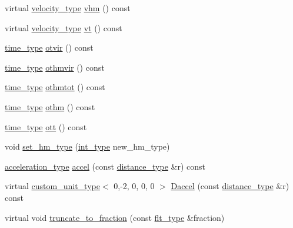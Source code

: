 \begin{DoxyCompactItemize}
\item 
virtual \hyperlink{namespaceIceBRG_a34f8ef3b46f3408301e3c28197095eff}{velocity\+\_\+type} \hyperlink{classIceBRG_1_1density__profile_a9ecd0afe7e8fa7050efe2d984240c0ec}{vhm} () const 
\item 
virtual \hyperlink{namespaceIceBRG_a34f8ef3b46f3408301e3c28197095eff}{velocity\+\_\+type} \hyperlink{classIceBRG_1_1density__profile_a11564ec6ea6103493654000c81ce4bfb}{vt} () const 
\item 
\hyperlink{namespaceIceBRG_abf6c442a2e180ef52c5cefe18e47c327}{time\+\_\+type} \hyperlink{classIceBRG_1_1density__profile_a0215cd84252abdb85682fbcc7eee19f4}{otvir} () const 
\item 
\hyperlink{namespaceIceBRG_abf6c442a2e180ef52c5cefe18e47c327}{time\+\_\+type} \hyperlink{classIceBRG_1_1density__profile_aad4e976a6e5d77b85ecb39d481d87d51}{othmvir} () const 
\item 
\hyperlink{namespaceIceBRG_abf6c442a2e180ef52c5cefe18e47c327}{time\+\_\+type} \hyperlink{classIceBRG_1_1density__profile_a88b1209927b800d5eb367bfc9469a139}{othmtot} () const 
\item 
\hyperlink{namespaceIceBRG_abf6c442a2e180ef52c5cefe18e47c327}{time\+\_\+type} \hyperlink{classIceBRG_1_1density__profile_a8ab2f8bffed3c330959f47f18174fa29}{othm} () const 
\item 
\hyperlink{namespaceIceBRG_abf6c442a2e180ef52c5cefe18e47c327}{time\+\_\+type} \hyperlink{classIceBRG_1_1density__profile_a8055fc7c1ce9cf0628ff4e849c4ff99b}{ott} () const 
\item 
void \hyperlink{classIceBRG_1_1density__profile_a8dea593a6ecb0f07e3106574f3ceb169}{set\+\_\+hm\+\_\+type} (\hyperlink{lib_2IceBRG__main_2common_8h_ac4de9d9335536ac22821171deec8d39e}{int\+\_\+type} new\+\_\+hm\+\_\+type)
\item 
\hyperlink{namespaceIceBRG_ab10fe6d8fe6432a7dc0aa5a8ecac6a14}{acceleration\+\_\+type} \hyperlink{classIceBRG_1_1density__profile_a7503bcdce1e01051b027da3e53ac487e}{accel} (const \hyperlink{namespaceIceBRG_a45499647eb87e24c10ab32c628711cec}{distance\+\_\+type} \&r) const 
\item 
virtual \hyperlink{namespaceIceBRG_a896bc1bf7e8db5ca045b9cf35912ca5e}{custom\+\_\+unit\+\_\+type}$<$ 0,-\/2, 0, 0, 0 $>$ \hyperlink{classIceBRG_1_1density__profile_a9f3a8f3c294f3c07159effde5a32d528}{Daccel} (const \hyperlink{namespaceIceBRG_a45499647eb87e24c10ab32c628711cec}{distance\+\_\+type} \&r) const 
\item 
virtual void \hyperlink{classIceBRG_1_1density__profile_ac7b6a0bf55ce53aeeccbf7322a49e54c}{truncate\+\_\+to\+\_\+fraction} (const \hyperlink{lib_2IceBRG__main_2common_8h_ad0f130a56eeb944d9ef2692ee881ecc4}{flt\+\_\+type} \&fraction)
\end{DoxyCompactItemize}
